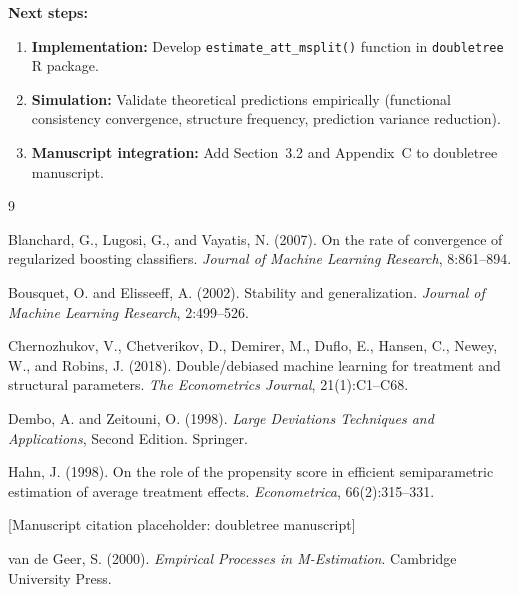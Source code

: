\documentclass[12pt]{article}
\begin{document}
\textbf{Next steps:}
\begin{enumerate}
\item \textbf{Implementation:} Develop \texttt{estimate\_att\_msplit()} function in \texttt{doubletree} R package.
\item \textbf{Simulation:} Validate theoretical predictions empirically (functional consistency convergence, structure frequency, prediction variance reduction).
\item \textbf{Manuscript integration:} Add Section~3.2 and Appendix~C to doubletree manuscript.
\end{enumerate}


\begin{thebibliography}{9}

Blanchard, G., Lugosi, G., and Vayatis, N. (2007).
On the rate of convergence of regularized boosting classifiers.
\textit{Journal of Machine Learning Research}, 8:861--894.

Bousquet, O. and Elisseeff, A. (2002).
Stability and generalization.
\textit{Journal of Machine Learning Research}, 2:499--526.

Chernozhukov, V., Chetverikov, D., Demirer, M., Duflo, E., Hansen, C., Newey, W., and Robins, J. (2018).
Double/debiased machine learning for treatment and structural parameters.
\textit{The Econometrics Journal}, 21(1):C1--C68.

Dembo, A. and Zeitouni, O. (1998).
\textit{Large Deviations Techniques and Applications}, Second Edition.
Springer.

Hahn, J. (1998).
On the role of the propensity score in efficient semiparametric estimation of average treatment effects.
\textit{Econometrica}, 66(2):315--331.

[Manuscript citation placeholder: doubletree manuscript]

van de Geer, S. (2000).
\textit{Empirical Processes in M-Estimation}.
Cambridge University Press.

\end{thebibliography}
\end{document}
